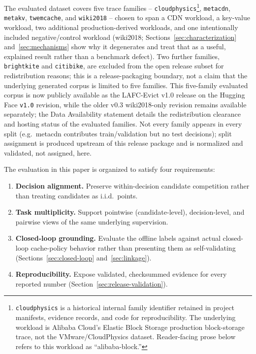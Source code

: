 The evaluated dataset covers five trace families -- \texttt{cloudphysics}\footnote{\texttt{cloudphysics} is a historical internal family identifier retained in project manifests, evidence records, and code for reproducibility. The underlying workload is Alibaba Cloud's Elastic Block Storage production block-storage trace, not the VMware/CloudPhysics dataset. Reader-facing prose below refers to this workload as ``alibaba-block.''},
\texttt{metacdn}, \texttt{metakv}, \texttt{twemcache}, and
\texttt{wiki2018} -- chosen to span a CDN workload, a key-value workload,
two additional production-derived workloads, and one intentionally
included negative/control workload (wiki2018; Sections~\ref{sec:characterization}
and~\ref{sec:mechanisms} show why it degenerates and treat that as a
useful, explained result rather than a benchmark defect). Two further
families, \texttt{brightkite} and \texttt{citibike}, are excluded from the
open release subset for redistribution reasons; this is a release-packaging
boundary, not a claim that the underlying generated corpus is limited to
five families. This five-family evaluated corpus is now publicly available as the LAFC-Evict v1.0 release on the Hugging Face \texttt{v1.0} revision, while the older v0.3 wiki2018-only revision remains available separately; the Data Availability statement details the redistribution clearance and hosting status of the evaluated families. Not
every family appears in every split (e.g.\ metacdn
contributes train/validation but no test decisions); split assignment is
produced upstream of this release package and is normalized and validated,
not assigned, here.

The evaluation in this paper is organized to satisfy four requirements:
\begin{enumerate}[leftmargin=*]
  \item \textbf{Decision alignment.} Preserve within-decision candidate
  competition rather than treating candidates as i.i.d.\ points.
  \item \textbf{Task multiplicity.} Support pointwise (candidate-level),
  decision-level, and pairwise views of the same underlying supervision.
  \item \textbf{Closed-loop grounding.} Evaluate the offline labels
  against actual closed-loop cache-policy behavior rather than presenting
  them as self-validating (Sections~\ref{sec:closed-loop}
  and~\ref{sec:linkage}).
  \item \textbf{Reproducibility.} Expose validated, checksummed evidence
  for every reported number (Section~\ref{sec:release-validation}).
\end{enumerate}

